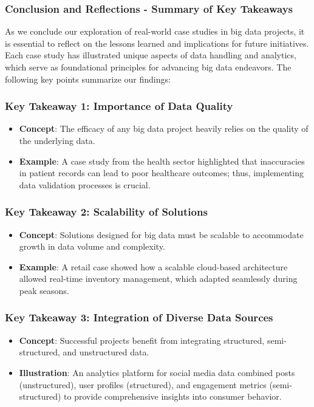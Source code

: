 \documentclass[aspectratio=169]{beamer}
\begin{document}
\begin{frame}[fragile]
    \frametitle{Conclusion and Reflections - Summary of Key Takeaways}
    As we conclude our exploration of real-world case studies in big data projects, it is essential to reflect on the lessons learned and implications for future initiatives. Each case study has illustrated unique aspects of data handling and analytics, which serve as foundational principles for advancing big data endeavors. The following key points summarize our findings:
\end{frame}

\begin{frame}[fragile]
    \frametitle{Key Takeaway 1: Importance of Data Quality}
    \begin{itemize}
        \item \textbf{Concept}: The efficacy of any big data project heavily relies on the quality of the underlying data.
        \item \textbf{Example}: A case study from the health sector highlighted that inaccuracies in patient records can lead to poor healthcare outcomes; thus, implementing data validation processes is crucial.
    \end{itemize}
\end{frame}

\begin{frame}[fragile]
    \frametitle{Key Takeaway 2: Scalability of Solutions}
    \begin{itemize}
        \item \textbf{Concept}: Solutions designed for big data must be scalable to accommodate growth in data volume and complexity.
        \item \textbf{Example}: A retail case showed how a scalable cloud-based architecture allowed real-time inventory management, which adapted seamlessly during peak seasons.
    \end{itemize}
\end{frame}

\begin{frame}[fragile]
    \frametitle{Key Takeaway 3: Integration of Diverse Data Sources}
    \begin{itemize}
        \item \textbf{Concept}: Successful projects benefit from integrating structured, semi-structured, and unstructured data.
        \item \textbf{Illustration}: An analytics platform for social media data combined posts (unstructured), user profiles (structured), and engagement metrics (semi-structured) to provide comprehensive insights into consumer behavior.
    \end{itemize}
\end{frame}
\end{document}
